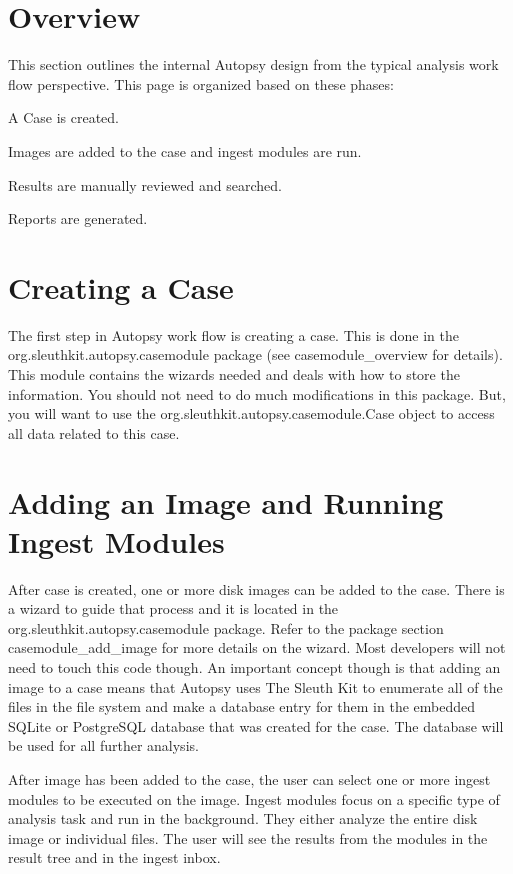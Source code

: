 \hypertarget{workflow_page_design_overview}{}\section{Overview}\label{workflow_page_design_overview}
This section outlines the internal Autopsy design from the typical analysis work flow perspective. This page is organized based on these phases\+:
\begin{DoxyItemize}
\item A Case is created.
\item Images are added to the case and ingest modules are run.
\item Results are manually reviewed and searched.
\item Reports are generated.
\end{DoxyItemize}\hypertarget{workflow_page_design_case}{}\section{Creating a Case}\label{workflow_page_design_case}
The first step in Autopsy work flow is creating a case. This is done in the org.\+sleuthkit.\+autopsy.\+casemodule package (see casemodule\+\_\+overview for details). This module contains the wizards needed and deals with how to store the information. You should not need to do much modifications in this package. But, you will want to use the org.\+sleuthkit.\+autopsy.\+casemodule.\+Case object to access all data related to this case.\hypertarget{workflow_page_design_image}{}\section{Adding an Image and Running Ingest Modules}\label{workflow_page_design_image}
After case is created, one or more disk images can be added to the case. There is a wizard to guide that process and it is located in the org.\+sleuthkit.\+autopsy.\+casemodule package. Refer to the package section casemodule\+\_\+add\+\_\+image for more details on the wizard. Most developers will not need to touch this code though. An important concept though is that adding an image to a case means that Autopsy uses The Sleuth Kit to enumerate all of the files in the file system and make a database entry for them in the embedded S\+Q\+Lite or Postgre\+S\+QL database that was created for the case. The database will be used for all further analysis.

After image has been added to the case, the user can select one or more ingest modules to be executed on the image. Ingest modules focus on a specific type of analysis task and run in the background. They either analyze the entire disk image or individual files. The user will see the results from the modules in the result tree and in the ingest inbox.

